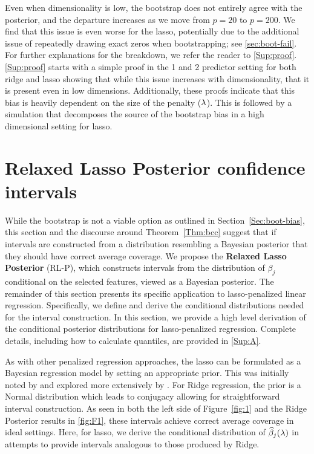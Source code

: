 Even when dimensionality is low, the bootstrap does not entirely agree with the posterior, and the departure increases as we move from $p=20$ to $p=200$. We find that this issue is even worse for the lasso, potentially due to the additional issue of repeatedly drawing exact zeros when bootstrapping; see \ref{sec:boot-fail}. For further explanations for the breakdown, we refer the reader to \ref{Sup:proof}. \ref{Sup:proof} starts with a simple proof in the 1 and 2 predictor setting for both ridge and lasso showing that while this issue increases with dimensionality, that it is present even in low dimensions. Additionally, these proofs indicate that this bias is heavily dependent on the size of the penalty ($\lambda$). This is followed by a simulation that decomposes the source of the bootstrap bias in a high dimensional setting for lasso.

\section{Relaxed Lasso Posterior confidence intervals}\label{Sec:methods}

While the bootstrap is not a viable option as outlined in Section~\ref{Sec:boot-bias}, this section and the discourse around Theorem~\ref{Thm:bcc} suggest that if intervals are constructed from a distribution resembling a Bayesian posterior that they should have correct average coverage. We propose the \textbf{Relaxed Lasso Posterior} (RL-P), which constructs intervals from the distribution of $\beta_j$ conditional on the selected features, viewed as a Bayesian posterior. The remainder of this section presents its specific application to lasso-penalized linear regression. Specifically, we define and derive the conditional distributions needed for the interval construction. In this section, we provide a high level derivation of the conditional posterior distributions for lasso-penalized regression. Complete details, including how to calculate quantiles, are provided in \ref{Sup:A}.

As with other penalized regression approaches, the lasso can be formulated as a Bayesian regression model by setting an appropriate prior. This was initially noted by \cite{Tibshirani1996} and explored more extensively by \cite{Park2008}.  For Ridge regression, the prior is a Normal distribution which leads to conjugacy allowing for straightforward interval construction. As seen in both the left side of Figure~\ref{fig:1} and the Ridge Posterior results in \ref{fig:F1}, these intervals achieve correct average coverage in ideal settings. Here, for lasso, we derive the conditional distribution of $\widehat{\beta}_j(\lambda)$ in attempts to provide intervals analogous to those produced by Ridge.

